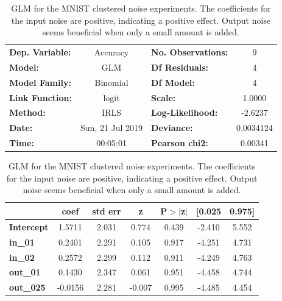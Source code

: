 \documentclass{article}
\begin{document}
\begin{table}[!htb]
	\centering
	\caption{GLM for the MNIST clustered noise experiments. The coefficients for the input noise are positive, indicating a positive effect. Output noise seems beneficial when only a small amount is added.}
	\begin{tabular}{lclc}
		\toprule
		\textbf{Dep. Variable:} &     Accuracy     & \textbf{  No. Observations:  } &        9    \\
		\textbf{Model:}         &       GLM        & \textbf{  Df Residuals:      } &        4    \\
		\textbf{Model Family:}  &     Binomial     & \textbf{  Df Model:          } &        4    \\
		\textbf{Link Function:} &      logit       & \textbf{  Scale:             } &    1.0000   \\
		\textbf{Method:}        &       IRLS       & \textbf{  Log-Likelihood:    } &   -2.6237   \\
		\textbf{Date:}          & Sun, 21 Jul 2019 & \textbf{  Deviance:          } & 0.0034124   \\
		\textbf{Time:}          &     00:05:01     & \textbf{  Pearson chi2:      } &  0.00341    \\
		\bottomrule
	\end{tabular}
	\begin{tabular}{lcccccc}
		& \textbf{coef} & \textbf{std err} & \textbf{z} & \textbf{P$>$$|$z$|$} & \textbf{[0.025} & \textbf{0.975]}  \\
		\midrule
		\textbf{Intercept} &       1.5711  &        2.031     &     0.774  &         0.439        &       -2.410    &        5.552     \\
		\textbf{in\_01}    &       0.2401  &        2.291     &     0.105  &         0.917        &       -4.251    &        4.731     \\
		\textbf{in\_02}    &       0.2572  &        2.299     &     0.112  &         0.911        &       -4.249    &        4.763     \\
		\textbf{out\_01}   &       0.1430  &        2.347     &     0.061  &         0.951        &       -4.458    &        4.744     \\
		\textbf{out\_025}  &      -0.0156  &        2.281     &    -0.007  &         0.995        &       -4.485    &        4.454     \\
		\bottomrule
	\end{tabular}
	\label{table:MNIST_clustered_GLM}
\end{table}
\end{document}
